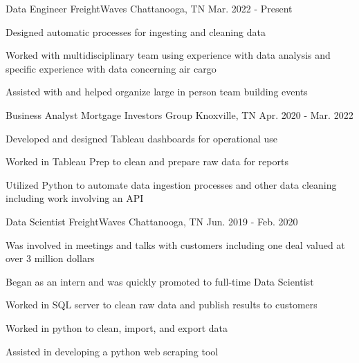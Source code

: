 
\begin{cventries}
  \cventry
    {Data Engineer} %
    {FreightWaves} %
    {Chattanooga, TN} %
    {Mar. 2022 - Present} %
    {
      \begin{cvitems} %
        \item {Designed automatic processes for ingesting and cleaning data}
        \item {Worked with multidisciplinary team using experience with data analysis and specific experience with data concerning air cargo}
        \item {Assisted with and helped organize large in person team building events}
      \end{cvitems}
    }
    
  \cventry
    {Business Analyst} %
    {Mortgage Investors Group} %
    {Knoxville, TN} %
    {Apr. 2020 - Mar. 2022} %
    {
      \begin{cvitems} %
        \item Developed and designed Tableau dashboards for operational use
        \item Worked in Tableau Prep to clean and prepare raw data for reports
        \item Utilized Python to automate data ingestion processes and other data cleaning including work involving an API
      \end{cvitems}
    }
    
  \cventry
    {Data Scientist} %
    {FreightWaves} %
    {Chattanooga, TN} %
    {Jun. 2019 - Feb. 2020} %
    {
      \begin{cvitems} %
        \item {Was involved in meetings and talks with customers including one deal valued at over 3 million dollars}
        \item {Began as an intern and was quickly promoted to full-time Data Scientist}
        \item {Worked in SQL server to clean raw data and publish results to customers}
        \item {Worked in python to clean, import, and export data}
        \item {Assisted in developing a python web scraping tool}
      \end{cvitems}
    }


\end{cventries}
